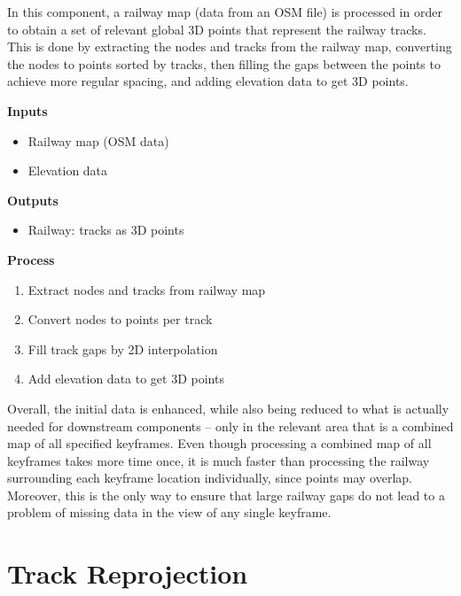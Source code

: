 In this component, a railway map (data from an OSM file) is processed in order to obtain a set of relevant global 3D points that represent the railway tracks. This is done by extracting the nodes and tracks from the railway map, converting the nodes to points sorted by tracks, then filling the gaps between the points to achieve more regular spacing, and adding elevation data to get 3D points.

\begin{multicols}{2}
    \textbf{Inputs}
    \begin{itemize}
        \item Railway map (OSM data)
        \item Elevation data
    \end{itemize}
    
    \textbf{Outputs}
    \begin{itemize}
      \item Railway: tracks as 3D points
    \end{itemize}

    \vfill\null
    \columnbreak

    \textbf{Process}
    \begin{enumerate}
        \item Extract nodes and tracks from railway map
        \item Convert nodes to points per track
        \item Fill track gaps by 2D interpolation
        \item Add elevation data to get 3D points
    \end{enumerate}
\end{multicols}

Overall, the initial data is enhanced, while also being reduced to what is actually needed for downstream components -- only in the relevant area that is a combined map of all specified keyframes. Even though processing a combined map of all keyframes takes more time once, it is much faster than processing the railway surrounding each keyframe location individually, since points may overlap. Moreover, this is the only way to ensure that large railway gaps do not lead to a problem of missing data in the view of any single keyframe.

\section{Track Reprojection}
\label{sec:track_reprojection}

